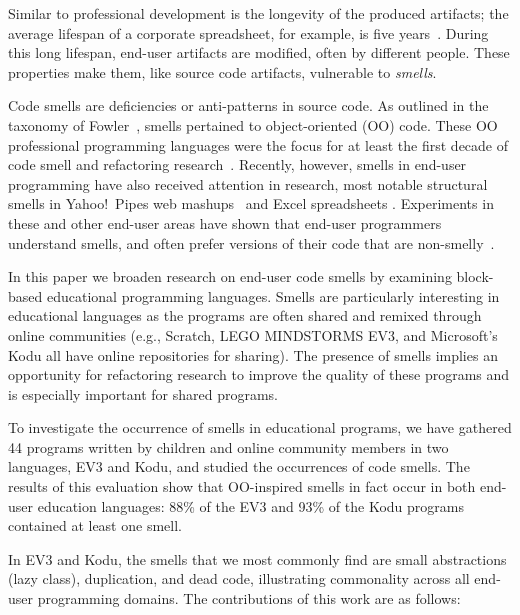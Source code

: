 \documentclass[conference]{IEEEtran}
\newcommand{\ms}{LEGO MINDSTORMS EV3}
\begin{document}
Similar to professional development is the longevity of the produced artifacts; the average lifespan of a corporate spreadsheet, for example, is five years~\cite{Hermans2011}. During this long lifespan, end-user artifacts are modified, often by different people.
These properties make them, like source code artifacts, vulnerable to \emph{smells}. 

Code smells are deficiencies or anti-patterns in source code. 
As outlined in the taxonomy of Fowler~\cite{Fowl1999}, smells pertained to object-oriented (OO) code. 
These OO professional programming languages were the focus for at least the first decade of code smell  and refactoring research~\cite{Mens:2004:SSR:972215.972286}. 
Recently, however, smells in end-user programming have also received attention in research, most notable structural smells in Yahoo!\ Pipes web mashups~\cite{Stolee2011} and Excel spreadsheets \cite{Hermans2012inter}. Experiments in these and other end-user areas have shown that end-user programmers understand smells, and often prefer versions of their code that are non-smelly~\cite{Hermans2012intra, StoleeTSE2013, chambers2013smell}.


In this paper we broaden research on end-user code smells by examining  block-based educational programming languages. Smells are particularly interesting in educational languages as the programs are often shared and remixed through online communities (e.g., Scratch, \ms, and Microsoft's Kodu all have online repositories for sharing). The presence of smells implies an opportunity for refactoring research to improve the quality of these programs and is especially important for shared programs. 

To investigate the occurrence of smells in  educational programs, we have gathered 44 programs written by children and online community members in two languages, EV3 and  Kodu, and studied the occurrences of code smells.
The results of this evaluation show that OO-inspired smells in fact occur in both end-user education languages: 88\% of the EV3 and 93\% of the Kodu programs contained at least one smell. 

In EV3 and Kodu, the smells that we most commonly find are small abstractions (lazy class), duplication, and dead code, illustrating commonality across all end-user programming domains. The contributions of this work are as follows:
\end{document}

